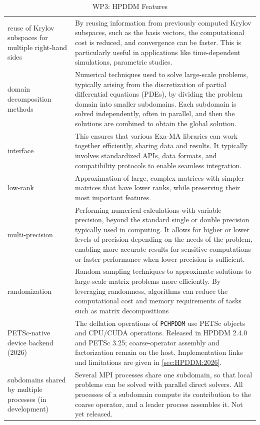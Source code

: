 \begin{table}[h!]
{{\begin{tabular}{!{\color{numpexgray}\vrule}p{.25\linewidth}!{\color{numpexgray}\vrule}p{.6885\linewidth}!{\color{numpexgray}\vrule}}
    reuse of Krylov subspaces for multiple right-hand sides & By reusing information from previously computed Krylov subspaces, such as the basis vectors, the computational cost is reduced, and convergence can be faster. This is particularly useful in applications like time-dependent simulations, parametric studies. \\
    domain decomposition methods & Numerical techniques used to solve large-scale problems, typically arising from the discretization of partial differential equations (PDEs), by dividing the problem domain into smaller subdomains. Each subdomain is solved independently, often in parallel, and then the solutions are combined to obtain the global solution.\\
    interface & This ensures that various Exa-MA libraries can work together efficiently, sharing data and results. It typically involves standardized APIs, data formats, and compatibility protocols to enable seamless integration.\\
    low-rank & Approximation of large, complex matrices with simpler matrices that have lower ranks, while preserving their most important features. \\
    multi-precision & Performing numerical calculations with variable precision, beyond the standard single or double precision typically used in computing. It allows for higher or lower levels of precision depending on the needs of the problem, enabling more accurate results for sensitive computations or faster performance when lower precision is sufficient. \\
    randomization & Random sampling techniques to approximate solutions to large-scale matrix problems more efficiently. By leveraging randomness, algorithms can reduce the computational cost and memory requirements of tasks such as matrix decompositions \\
    PETSc-native device backend (2026) & The deflation operations of \texttt{PCHPDDM} use PETSc objects and CPU/CUDA operations. Released in HPDDM 2.4.0 and PETSc 3.25; coarse-operator assembly and factorization remain on the host. Implementation links and limitations are given in \cref{sec:HPDDM:2026}. \\
    subdomains shared by multiple processes (in development) & Several MPI processes share one subdomain, so that local problems can be solved with parallel direct solvers. All processes of a subdomain compute its contribution to the coarse operator, and a leader process assembles it. Not yet released. \\
\end{tabular}
        }
    }
    \caption{WP3: HPDDM Features}
    \label{tab:WP3:HPDDM:features}
\end{table}


